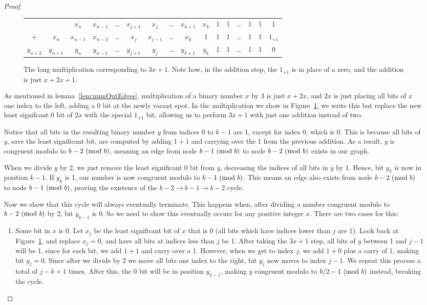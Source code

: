 \begin{proof}
\begin{figure}
\begin{tabular}{*{16}c}
  & & $ x_{n}$  & $ x_{n-1}$  & \ldots & $ x_{j+1}$  & $ x_{j}$  & \ldots & $ x_{k+1}$  & $ x_{k}$  & 1 & 1 & \ldots & 1 & 1 & 1 \\
  + & $ x_{n}$  & $ x_{n-1}$  & $ x_{n-2}$  & \ldots & $ x_{j}$  & $ x_{j-1}$  & \ldots & $ x_{k}$  & 1 & 1 & 1 & \ldots & 1 & 1 & $1_{+1}$  \\
  \hline
  $ y_{n+2}$  & $ y_{n+1}$  & $ y_{n}$  & $ y_{n-1}$  & \ldots & $ y_{j+1}$  & $ y_{j}$  & \ldots & $ y_{k+1}$  & $ y_{k}$  & 1 & 1 & \ldots & 1 & 1 & 0 
\end{tabular}
\caption{The long multiplication corresponding to $3x + 1$. Note how, in the addition step, the $1_{+1}$ is in place of a zero, and the addition is just $x + 2x + 1$.}
\label{fig:mul}
\end{figure}
As mentioned in lemma~\ref{lem:numOutEdges}, multiplication of a binary number $x$ by 3 is just $x + 2x$, and $2x$ is just placing all bits of $x$ one index to the left, adding a 0 bit at the newly vacant spot. In the multiplication we show in Figure~\ref{fig:mul}, we write this but replace the new least signifcant 0 bit of $2x$ with the special $1_{+1}$ bit, allowing us to perform $3x+1$ with just one addition instead of two. \par
Notice that all bits in the resulting binary number $y$ from indices 0 to $k-1$ are 1, except for index 0, which is 0. This is because all bits of $y$, save the least significant bit, are computed by adding $1+1$ and carrying over the 1 from the previous addition. As a result, $y$ is congruent modulo to $b-2 \ (\mathrm{mod}\ b)$, meaning an edge from node $b-1 \ (\mathrm{mod}\ b)$ to node $b-2 \ (\mathrm{mod}\ b)$ exists in our graph.\par
When we divide $y$ by 2, we just remove the least significant 0 bit from $y$, decreasing the indices of all bits in $y$ by 1. Hence, bit $y_k$ is now in position $k-1$. If $y_k$ is 1, our number is now congruent modulo to $b-1 \ (\mathrm{mod}\ b)$. This means an edge also exists from node $b-2 \ (\mathrm{mod}\ b)$ to node $b-1 \ (\mathrm{mod}\ b)$, proving the existence of the $b-2 \rightarrow b-1 \rightarrow b-2$ cycle. \par
Now we show that this cycle will always eventually terminate. This happens when, after dividing a number congruent modulo to $b-2 \ (\mathrm{mod}\ b)$ by 2, bit $y_{k-1}$ is 0. So we need to show this eventually occurs for any positive integer $x$. There are two cases for this:
\begin{enumerate}
    \item Some bit in $x$ is 0. Let $x_j$ be the least significant bit of $x$ that is 0 (all bits which have indices lower than $j$ are 1). Look back at Figure~\ref{fig:mul}, and replace $x_j = 0$, and have all bits at indices less than $j$ be 1. After taking the $3x+1$ step, all bits of $y$ between 1 and $j-1$ will be 1, since for each bit, we add $1 + 1$ and carry over a 1. However, when we get to index $j$, we add $1 + 0$ plus a carry of 1, making bit $y_j = 0$. Since after we divide by 2 we move all bits one index to the right, bit $y_j$ now moves to index $j-1$. We repeat this process a total of $j-k+1$ times. After this, the 0 bit will be in position $y_{k-1}$, making $y$ congruent modulo to $b/2 - 1 \ (\mathrm{mod}\ b)$ instead, breaking the cycle.

\end{enumerate}
\end{proof}
